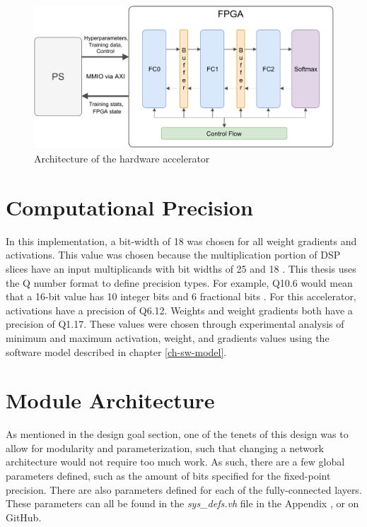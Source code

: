 \begin{figure}
	\centering 
	\includegraphics[width=\textwidth]{figures/overall_arch}
	\caption{Architecture of the hardware accelerator}\label{overall-arch}
\end{figure}

\section{Computational Precision}
In this implementation, a bit-width of 18 was chosen for all weight gradients and activations. This value was chosen because the multiplication portion of DSP slices have an input multiplicands with bit widths of 25 and 18 . This thesis uses the Q number format to define precision types. For example, Q10.6 would mean that a 16-bit value has 10 integer bits and 6 fractional bits \cite{q-format}. For this accelerator, activations have a precision of Q6.12. Weights and weight gradients both have a precision of Q1.17. These values were chosen through experimental analysis of minimum and maximum activation, weight, and gradients values using the software model described in chapter \ref{ch-sw-model}.

\section{Module Architecture}
As mentioned in the design goal section, one of the tenets of this design was to allow for modularity and parameterization, such that changing a network architecture would not require too much work. As such, there are a few global parameters defined, such as the amount of bits specified for the fixed-point precision. There are also parameters defined for each of the fully-connected layers. These parameters can all be found in the \textit{sys\_defs.vh} file in the Appendix , or on GitHub. 



